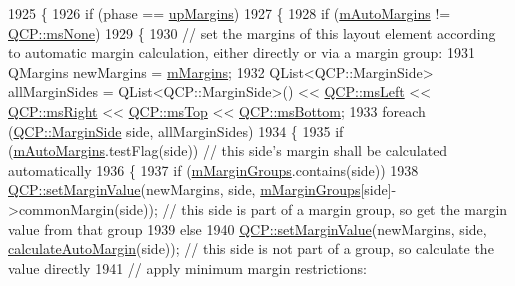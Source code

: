 \begin{DoxyCode}
1925 \{
1926   \textcolor{keywordflow}{if} (phase == \hyperlink{class_q_c_p_layout_element_a0d83360e05735735aaf6d7983c56374da288cb59a92280e47261a341f2813e676}{upMargins})
1927   \{
1928     \textcolor{keywordflow}{if} (\hyperlink{class_q_c_p_layout_element_af61c70354d1275778d68206b2a1b2d36}{mAutoMargins} != \hyperlink{namespace_q_c_p_a7e487e3e2ccb62ab7771065bab7cae54a80aa4149f16dabd538f8b2e3d42c42d5}{QCP::msNone})
1929     \{
1930       \textcolor{comment}{// set the margins of this layout element according to automatic margin calculation, either directly
       or via a margin group:}
1931       QMargins newMargins = \hyperlink{class_q_c_p_layout_element_ac2a32b99ee527ca5dfff9da03628fe94}{mMargins};
1932       QList<QCP::MarginSide> allMarginSides = QList<QCP::MarginSide>() << 
      \hyperlink{namespace_q_c_p_a7e487e3e2ccb62ab7771065bab7cae54a9500c8bfcc9e80b9dff0a8e00e867f07}{QCP::msLeft} << \hyperlink{namespace_q_c_p_a7e487e3e2ccb62ab7771065bab7cae54a93c719593bb2b94ed244d52c86d83b65}{QCP::msRight} << \hyperlink{namespace_q_c_p_a7e487e3e2ccb62ab7771065bab7cae54a5db8fb0d0b0ecf0d611c2602a348e8a0}{QCP::msTop} << 
      \hyperlink{namespace_q_c_p_a7e487e3e2ccb62ab7771065bab7cae54a5241d8eac2bab9524a38889f576179cc}{QCP::msBottom};
1933       \textcolor{keywordflow}{foreach} (\hyperlink{namespace_q_c_p_a7e487e3e2ccb62ab7771065bab7cae54}{QCP::MarginSide} side, allMarginSides)
1934       \{
1935         \textcolor{keywordflow}{if} (\hyperlink{class_q_c_p_layout_element_af61c70354d1275778d68206b2a1b2d36}{mAutoMargins}.testFlag(side)) \textcolor{comment}{// this side's margin shall be calculated
       automatically}
1936         \{
1937           \textcolor{keywordflow}{if} (\hyperlink{class_q_c_p_layout_element_aeafbbc1130e02eee663c5326761fc963}{mMarginGroups}.contains(side))
1938             \hyperlink{namespace_q_c_p_afbf6e3084c108f2bb4372107945ee82f}{QCP::setMarginValue}(newMargins, side, 
      \hyperlink{class_q_c_p_layout_element_aeafbbc1130e02eee663c5326761fc963}{mMarginGroups}[side]->commonMargin(side)); \textcolor{comment}{// this side is part of a margin group, so get the
       margin value from that group}
1939           \textcolor{keywordflow}{else}
1940             \hyperlink{namespace_q_c_p_afbf6e3084c108f2bb4372107945ee82f}{QCP::setMarginValue}(newMargins, side, 
      \hyperlink{class_q_c_p_layout_element_a005c9f0fe84bc1591a2cf2c46fd477b4}{calculateAutoMargin}(side)); \textcolor{comment}{// this side is not part of a group, so calculate the value
       directly}
1941           \textcolor{comment}{// apply minimum margin restrictions:}

\end{DoxyCode}
